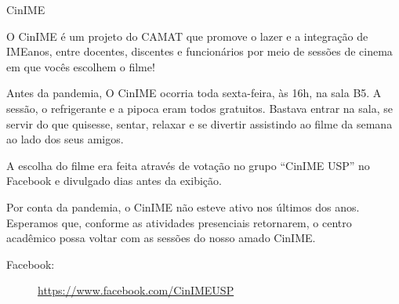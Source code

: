 \begin{subsecao}{CinIME}


O CinIME é um projeto do CAMAT que promove o
lazer e a integração de IMEanos, entre docentes, discentes e funcionários por
meio de sessões de cinema em que vocês escolhem o filme!

Antes da pandemia, O CinIME ocorria toda sexta-feira, às 16h, na sala B5. 
A sessão, o refrigerante e a pipoca eram todos gratuitos. Bastava entrar na sala, se servir do que
quisesse, sentar, relaxar e se divertir assistindo ao filme da semana ao lado dos
seus amigos.

A escolha do filme era feita através de votação no grupo “CinIME USP” no
Facebook e divulgado dias antes da exibição.

Por conta da pandemia, o CinIME não esteve ativo nos últimos dos anos. Esperamos que, 
conforme as atividades presenciais retornarem, o centro acadêmico possa voltar com as sessões 
do nosso amado CinIME.






\begin{description}
  \item[Facebook:] \url{https://www.facebook.com/CinIMEUSP}
\end{description}

\end{subsecao}
